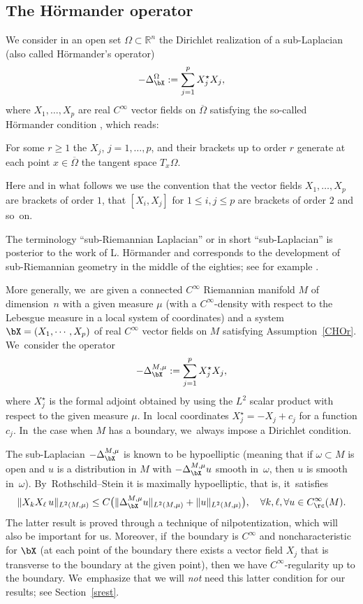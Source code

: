 \subsection{The Hörmander operator}
We consider in an open set $\Omega \subset \mathbb R^n$ the Dirichlet realization of a sub-Laplacian (also called Hörmander's operator)
\[
-\Delta_\bX^\Omega :=\sum_{j=1}^p X_j^\star X_j,
\]
where $X_1,\ldots,X_p$ are real $C^\infty$ vector fields on $\overline\Omega$ satisfying the so-called Hörmander condition \cite{Ho}, which reads:

\begin{assumption}\label{CHOr}
For some $r\geq 1$ the $X_j$, $j=1,\ldots,p$, and their brackets up to order $r$ generate at each point $ x\in \overline{\Omega}$ the tangent space $T_x \Omega$.
\end{assumption}

Here and in what follows we use the convention that the vector fields $X_1,\ldots,X_p$ are brackets of order $1$, that $[X_i,X_j]$ for $1\leq i,j\leq p$ are brackets of order $2$ and so~on.

The terminology ``sub-Riemannian Laplacian'' or in short ``sub-Laplacian'' is posterior to the work of L. Hörmander and corresponds to the development of sub-Riemannian geometry in the middle of the eighties; see for example \cite{AgBaBo,BeRi,Je,Str2}.

More generally, we~are given a connected $C^\infty$ Riemannian manifold $M$ of dimension~$n$ with a given measure $\mu$ (with a $C^\infty$-density with respect to the Lebesgue measure in a local system of coordinates) and a system $\bX= (X_1,\cdots,X_p)$ of real $C^\infty$ vector fields on $M$ satisfying Assumption~\ref{CHOr}. We~consider the operator
\[
-\Delta_\bX^{M,\mu} :=\sum_{j=1}^p X_j^\star X_j,
\]
where $X_j^\star$ is the formal adjoint obtained by using the $L^2$ scalar product with respect to the given measure $\mu$. In~local coordinates $X_j^\star =- X_j +c_j$ for a function $c_j$. In~the case when $M$ has a boundary, we~always impose a Dirichlet condition.

The sub-Laplacian $-\Delta_\bX^{M,\mu}$ is known to be hypoelliptic \cite{Ho} (meaning that if $\omega\subset M$ is open and $u$ is a distribution in $M$ with $-\Delta_\bX^{M,\mu} u$ smooth in~$\omega$, then $u$ is smooth in~$\omega$). By~Rothschild--Stein \cite{RS} it is maximally hypoelliptic, that is, it~satisfies
\[
\| X_k X_\ell \,u \|_{L^2(M,\mu)} \leq C \bigl(\|\Delta_\bX^{M,\mu} u \|_{L^2(M,\mu)} + \|u\|_{L^2(M,\mu)} \bigr), \quad \forall k,\ell, \forall u \in C_\rc^\infty(M).
\]
The latter result is proved through a technique of nilpotentization, which will also be important for us. Moreover, if~the boundary is $C^\infty$ and noncharacteristic for $\bX$ (\ie at each point of the boundary there exists a vector field $ X_j$ that is transverse to the boundary at the given point), then we have $C^\infty$-regularity up to the boundary. We~emphasize that we will \emph{not} need this latter condition for our results; see Section~\ref{srest}.

